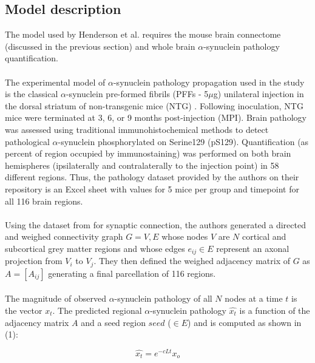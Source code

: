 \subsection{Model description}
The model used by Henderson et al. requires the mouse brain connectome (discussed in the previous section) and whole brain $\alpha$-synuclein pathology quantification.\\
\\
The experimental model of $\alpha$-synuclein pathology propagation used in the study is the classical $\alpha$-synuclein pre-formed fibrils (PFFs -  5$\mu$g) unilateral injection in the dorsal striatum of non-transgenic mice (NTG) \cite{Luk_2012, Henderson_2019}. Following inoculation, NTG mice were terminated at 3, 6, or 9 months post-injection (MPI). Brain pathology was assessed using traditional immunohistochemical methods to detect pathological $\alpha$-synuclein phosphorylated on Serine129 (pS129). Quantification (as percent of region occupied by immunostaining) was performed on both brain hemispheres (ipsilaterally and contralaterally to the injection point) in 58 different regions. Thus, the pathology dataset provided by the authors on their repository is an Excel sheet with values for 5 mice per group and timepoint for all 116 brain regions.\\
\\
Using the dataset from \cite{Oh_2014} for synaptic connection, the authors generated a directed and weighed connectivity graph $G={V,E}$ whose nodes $V$ are $N$ cortical and subcortical grey matter regions and whose edges $e_{ij} \in E$ represent an axonal projection from $V_{i}$ to $V_{j}$. They then defined the weighed adjacency matrix of $G$ as $A = [A_{ij}]$ generating a final parcellation of 116 regions.\\
\\
The magnitude of observed $\alpha$-synuclein pathology of all $N$ nodes at a time $t$ is the vector $x_{t}$. The predicted regional $\alpha$-synuclein pathology $\widehat{x_{t}}$ is a function of the adjacency matrix $A$ and a seed region $seed$ ($\in E$)  and is computed as shown in (1):

\begin{equation}
    \widehat{x_{t}}=e^{-cLt} x_{o}
\end{equation}

